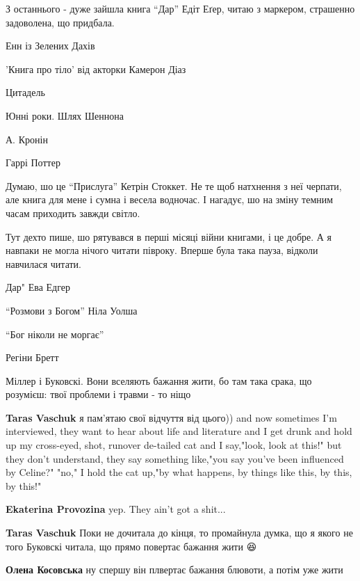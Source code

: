 З останнього - дуже зайшла книга \enquote{Дар} Едіт Еґер, читаю з маркером,
страшенно задоволена, що придбала.


Енн із Зелених Дахів


'Книга про тіло' від акторки Камерон Діаз


Цитадель

Юнні роки. Шлях Шеннона

А. Кронін


Гаррі Поттер🤩


Думаю, шо це \enquote{Прислуга} Кетрін Стоккет. Не те щоб натхнення з неї черпати, але
книга для мене і сумна і весела водночас. І нагадує, шо на зміну темним часам
приходить завжди світло.

Тут дехто пише, шо рятувався в перші місяці війни книгами, і це добре. А я
навпаки не могла нічого читати півроку. Вперше була така пауза, відколи
навчилася читати.


Дар" Ева Едгер


\enquote{Розмови з Богом} Ніла Уолша


\enquote{Бог ніколи не моргає}

Регіни Бретт


Міллер і Буковскі. Вони вселяють бажання жити, бо там така срака, що розумієш:
твої проблеми і травми - то ніщо 🤣

\begin{itemize} %
\textbf{Taras Vaschuk} я пам'ятаю свої відчуття від цього))
and now sometimes I'm interviewed, they want to hear about
life and literature and I get drunk and hold up my cross-eyed,
shot, runover de-tailed cat and I say,"look, look
at this!"
but they don't understand, they say something like,"you
say you've been influenced by Celine?"
"no," I hold the cat up,"by what happens, by
things like this, by this, by this!"

\textbf{Ekaterina Provozina} yep. They ain't got a shit...

\textbf{Taras Vaschuk} Поки не дочитала до кінця, то промайнула думка, що я якого не того Буковскі читала, що прямо повертає бажання жити 😆

\textbf{Олена Косовська} ну спершу він плвертає бажання блювоти, а потім уже жити 🤣
\end{itemize} %

